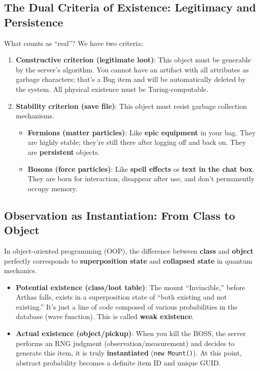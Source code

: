 \subsection{The Dual Criteria of Existence: Legitimacy and Persistence}

What counts as ``real''? We have two criteria:

\begin{enumerate}
\item \textbf{Constructive criterion (legitimate loot)}: This object must be generable by the server's algorithm. You cannot have an artifact with all attributes as garbage characters; that's a Bug item and will be automatically deleted by the system. All physical existence must be Turing-computable.

\item \textbf{Stability criterion (save file)}: This object must resist garbage collection mechanisms.
\begin{itemize}
\item \textbf{Fermions (matter particles)}: Like \textbf{epic equipment} in your bag. They are highly stable; they're still there after logging off and back on. They are \textbf{persistent} objects.
\item \textbf{Bosons (force particles)}: Like \textbf{spell effects} or \textbf{text in the chat box}. They are born for interaction, disappear after use, and don't permanently occupy memory.
\end{itemize}
\end{enumerate}

\subsection{Observation as Instantiation: From Class to Object}

In object-oriented programming (OOP), the difference between \textbf{class} and \textbf{object} perfectly corresponds to \textbf{superposition state} and \textbf{collapsed state} in quantum mechanics.

\begin{itemize}
\item \textbf{Potential existence (class/loot table)}: The mount ``Invincible,'' before Arthas falls, exists in a superposition state of ``both existing and not existing.'' It's just a line of code composed of various probabilities in the database (wave function). This is called \textbf{weak existence}.

\item \textbf{Actual existence (object/pickup)}: When you kill the BOSS, the server performs an RNG judgment (observation/measurement) and decides to generate this item, it is truly \textbf{instantiated} (\texttt{new Mount()}). At this point, abstract probability becomes a definite item ID and unique GUID.
\end{itemize}

